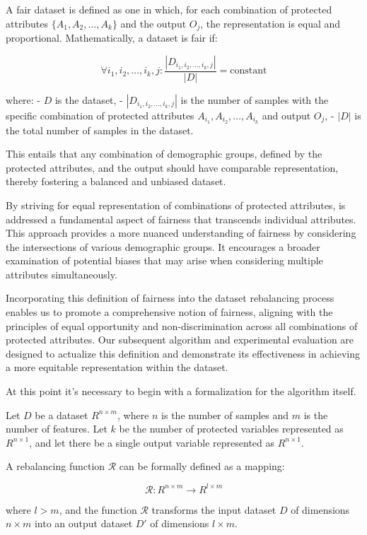 \documentclass[12pt,a4paper,openright,twoside]{book}
\begin{document}
A fair dataset is defined as one in which, for each combination of protected attributes $\{A_1, A_2, \ldots, A_k\}$ and the output $O_j$, the representation is equal and proportional. Mathematically, a dataset is fair if:

\[
\forall i_1, i_2, \ldots, i_k, j: \frac{|D_{i_1, i_2, \ldots, i_k, j}|}{|D|} = \text{constant}
\]

where:
- $D$ is the dataset,
- $|D_{i_1, i_2, \ldots, i_k, j}|$ is the number of samples with the specific combination of protected attributes $A_{i_1}, A_{i_2}, \ldots, A_{i_k}$ and output $O_j$,
- $|D|$ is the total number of samples in the dataset.

This entails that any combination of demographic groups, defined by the protected attributes, and the output should have comparable representation, thereby fostering a balanced and unbiased dataset.

By striving for equal representation of combinations of protected attributes, is addressed a fundamental aspect of fairness that transcends individual attributes. This approach provides a more nuanced understanding of fairness by considering the intersections of various demographic groups. It encourages a broader examination of potential biases that may arise when considering multiple attributes simultaneously.

Incorporating this definition of fairness into the dataset rebalancing process enables us to promote a comprehensive notion of fairness, aligning with the principles of equal opportunity and non-discrimination across all combinations of protected attributes. Our subsequent algorithm and experimental evaluation are designed to actualize this definition and demonstrate its effectiveness in achieving a more equitable representation within the dataset.

At this point it's necessary to begin with a formalization for the algorithm itself.


Let \( D \) be a dataset \( R^{n \times m} \), where \( n \) is the number of samples and \( m \) is the number of features. Let \( k \) be the number of protected variables represented as \( R^{n \times 1} \), and let there be a single output variable represented as \( R^{n \times 1} \).

A rebalancing function \( \mathcal{R} \) can be formally defined as a mapping:

\[
\mathcal{R}: R^{n \times m} \rightarrow R^{l \times m}
\]

where \( l > m \), and the function \( \mathcal{R} \) transforms the input dataset \( D \) of dimensions \( n \times m \) into an output dataset \( D' \) of dimensions \( l \times m \).
\end{document}
